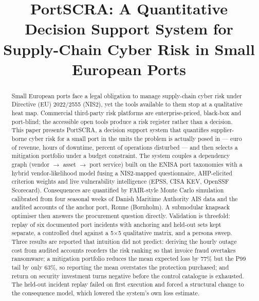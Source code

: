 \documentclass[conference]{IEEEtran}
\begin{document}
\title{PortSCRA: A Quantitative Decision Support System for\\
Supply-Chain Cyber Risk in Small European Ports}

\author{
}

\maketitle

\begin{abstract}
Small European ports face a legal obligation to manage supply-chain cyber risk
under Directive (EU) 2022/2555 (NIS2), yet the tools available to them stop at a
qualitative heat map. Commercial third-party risk platforms are enterprise-priced,
black-box and port-blind; the accessible open tools produce a risk register rather
than a decision. This paper presents PortSCRA, a decision support system that
quantifies supplier-borne cyber risk for a small port in the units the problem is
actually posed in --- euro of revenue, hours of downtime, percent of operations
disturbed --- and then selects a mitigation portfolio under a budget constraint.
The system couples a dependency graph (vendor $\rightarrow$ asset $\rightarrow$
port service) built on the ENISA port taxonomies with a hybrid vendor-likelihood
model fusing a NIS2-mapped questionnaire, AHP-elicited criterion weights and live
vulnerability intelligence (EPSS, CISA KEV, OpenSSF Scorecard). Consequences are
quantified by FAIR-style Monte Carlo simulation calibrated from four seasonal weeks
of Danish Maritime Authority AIS data and the audited accounts of the anchor port,
Rønne (Bornholm). A submodular knapsack optimiser then answers the procurement
question directly. Validation is threefold: replay of six documented port incidents
with anchoring and held-out sets kept separate, a controlled duel against a
5$\times$5 qualitative matrix, and a persona sweep. Three results are reported that
intuition did not predict: deriving the hourly outage cost from audited accounts
reorders the risk ranking so that invoice fraud overtakes ransomware; a mitigation
portfolio reduces the mean expected loss by 77\% but the P99 tail by only 63\%, so
reporting the mean overstates the protection purchased; and return on security
investment turns negative before the control catalogue is exhausted. The held-out
incident replay failed on first execution and forced a structural change to the
consequence model, which lowered the system's own loss estimate.
\end{abstract}
\end{document}
